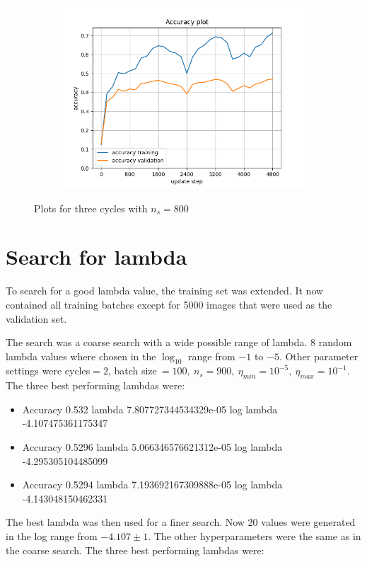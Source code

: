 \documentclass[12pt, a4paper]{article}
\begin{document}
\begin{figure}[H]
\begin{subfigure}{0.45\textwidth}
        \includegraphics[width=\textwidth]{results/3-800accuracy.png}
    \end{subfigure}
    \caption{Plots for three cycles with $n_s=800$}
    \label{fig:three cycles}
\end{figure}

\section{Search for lambda}
To search for a good lambda value, the training set was extended. It now contained all training batches except for 5000 images that were used as the validation set.

The search was a coarse search with a wide possible range of lambda. 8 random lambda values where chosen in the $\log_{10}$ range from $-1$ to $-5$. Other parameter settings were cycles$=2$, batch size$\ =100,\ n_s=900,\ \eta_{min}=10^{-5},\ \eta_{max}=10^{-1}$. The three best performing lambdas were:
\begin{itemize}
    \item Accuracy 0.532 lambda 7.807727344534329e-05 log lambda -4.107475361175347
    \item Accuracy 0.5296 lambda 5.066346576621312e-05 log lambda -4.295305104485099
    \item Accuracy 0.5294 lambda 7.193692167309888e-05 log lambda -4.143048150462331
\end{itemize}

The best lambda was then used for a finer search. Now 20 values were generated in the log range from $-4.107\pm 1$. The other hyperparameters were the same as in the coarse search. The three best performing lambdas were:
\end{document}
